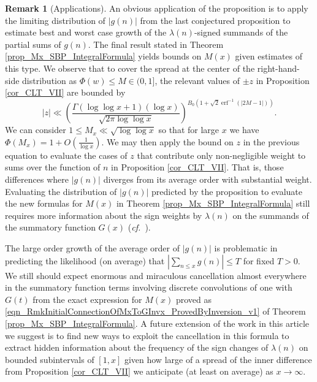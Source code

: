 \documentclass[11pt,reqno,a4letter]{article}
\newcommand{\hlocalref}[1]{\hyperref[#1]{\ref{#1}}}
\numberwithin{equation}{section}
\numberwithin{figure}{section}
\numberwithin{table}{section}
\newcommand{\cf}{\textit{cf.\ }}
\theoremstyle{plain}
\numberwithin{theorem}{section}
\theoremstyle{definition}
\newtheorem{remark}[theorem]{Remark}
\begin{document}
\begin{remark}[Applications]
An obvious application of the proposition is to apply the limiting 
distribution of $|g(n)|$ from the last conjectured proposition to estimate 
best and worst case growth of the $\lambda(n)$-signed summands of the 
partial sums of $g(n)$. The final result stated in 
Theorem \hlocalref{prop_Mx_SBP_IntegralFormula} 
yields bounds on $M(x)$ given estimates of this type. 
We observe that to cover the spread at the center of the right-hand-side distribution 
as $\Phi(w) \leq M \in (0, 1]$, the relevant values of $\pm z$ in 
Proposition \hlocalref{cor_CLT_VII} are bounded by  
\[
|z| \ll \left(\frac{\Gamma(\log\log x + 1) (\log x)}{\sqrt{2\pi \log\log x}}\right)^{ 
	B_0\left(1 + \sqrt{2} \operatorname{erf}^{-1}\left(|2M-1|\right)\right)}.
\]
We can consider $1 \leq M_x \ll \sqrt{\log\log x}$ so that for large $x$ we have
$\Phi(M_x) = 1 + O\left(\frac{1}{\log x}\right)$. 
We may then apply the bound on $z$ in the previous equation to evaluate 
the cases of $z$ that contribute only non-negligible weight to sums over 
the function of $n$ in Proposition \hlocalref{cor_CLT_VII}. 
That is, those differences where $|g(n)|$ diverges from its average 
order with substantial weight. 
Evaluating the distribution of $|g(n)|$ predicted by the proposition to 
evaluate the new formulas for $M(x)$ in 
Theorem \hlocalref{prop_Mx_SBP_IntegralFormula} 
still requires more information 
about the sign weights by $\lambda(n)$ on the summands of the summatory function $G(x)$ 
(\cf \cite{SIGN-CHANGES-OSCARITHFUNCTS}). 

The large order growth of the average order of $|g(n)|$ is problematic in 
predicting the likelihood (on average) that 
$\left\lvert \sum_{n \leq x} g(n) \right\rvert \leq T$ for fixed $T > 0$. 
We still should expect enormous and miraculous cancellation almost everywhere 
in the summatory function terms involving discrete convolutions of one with 
$G(t)$ from the exact expression for $M(x)$ proved as 
\eqref{eqn_RmkInitialConnectionOfMxToGInvx_ProvedByInversion_v1} of 
Theorem \hlocalref{prop_Mx_SBP_IntegralFormula}. 
A future extension of the work in this article we suggest is to find new ways to 
exploit the cancellation in this formula to extract 
hidden information about the frequency of the sign changes of $\lambda(n)$ 
on bounded subintervals of $[1, x]$ given how large of a spread of the inner difference from 
Proposition \hlocalref{cor_CLT_VII} 
we anticipate (at least on average) as $x \rightarrow \infty$. 
\end{remark}
\end{document}

